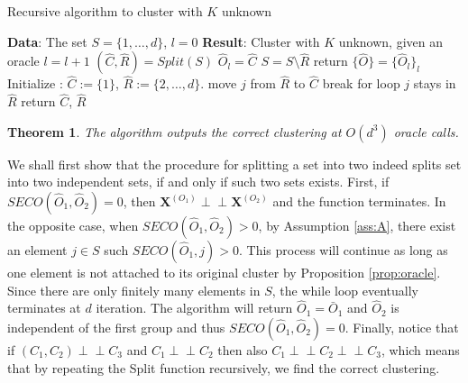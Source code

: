 \documentclass[11pt]{article}
\makeatletter
\newtheorem{theorem}{Theorem}
\renewenvironment{proof}[1][\proofname]{\par
\pushQED{\qed}%
\normalfont \topsep6\p@\@plus6\p@\relax
\trivlist
\item\relax
{\textbf{
#1\@addpunct{ }}}\hspace\labelsep\ignorespaces
}{%
\popQED\endtrivlist\@endpefalse
}
\newcommand{\indep}{\perp \!\!\! \perp}
\makeatother
\begin{document}
	\begin{algorithm}

\caption{Recursive algorithm to cluster with $K$ unknown}

\begin{algorithmic}[1]
\State \textbf{Data}: The set $S = \{1,\dots,d\}$, $l = 0$
\State \textbf{Result}: Cluster with $K$ unknown, given an oracle
    		\State $l = l+1$
    		\State $(\hat{C}, \hat{R}) = Split(S)$
    		\State $\hat{O}_l = \hat{C}$
    		\State $S = S \setminus \hat{R}$
    \EndWhile
    \State return $\{\hat{O}\} = \{ \hat{O}_l \}_{l}$
\EndProcedure
{}
    \State Initialize : $\hat{C} := \{1\}$, $\hat{R} :=  \{2, \dots, d\}$.
    				\State move $j$ from $\hat{R}$ to $\hat{C}$
    				\State break for loop
    			\Else{}
    				\State $j$ stays in $\hat{R}$
    			\EndIf
    		\EndFor
    \EndWhile
    \State return $\hat{C}$, $\hat{R}$
\EndProcedure
\end{algorithmic}
\label{alg:rec}
\end{algorithm}

	\begin{theorem}
		The algorithm outputs the correct clustering at $O(d^3)$ oracle calls.
	\end{theorem}
	\begin{proof}
		We shall first show that the procedure for splitting a set into two indeed splits set into two independent sets, if and only if such two sets exists. First, if $SECO(\hat{O}_1,\hat{O}_2) = 0$, then $\textbf{X}^{(O_1)} \indep \textbf{X}^{(O_2)}$ and the function terminates. In the opposite case, when $SECO(\hat{O}_1,\hat{O}_2) > 0$, by Assumption \ref{ass:A}, there exist an element $j \in S$ such $SECO(\hat{O}_1, j) > 0$. This process will continue as long as one element is not attached to its original cluster by Proposition \ref{prop:oracle}. Since there are only finitely many elements in $S$, the while loop eventually terminates at $d$ iteration. The algorithm will return $\hat{O}_1 = \bar{O}_1$ and $\hat{O}_2$ is independent of the first group and thus $SECO(\hat{O}_1, \hat{O}_2) = 0$. Finally, notice that if $(C_1, C_2) \indep C_3$ and $C_1 \indep C_2$ then also $C_1 \indep C_2 \indep C_3$, which means that by repeating the Split function recursively, we find the correct clustering.
	\end{proof}
	
\end{document}
